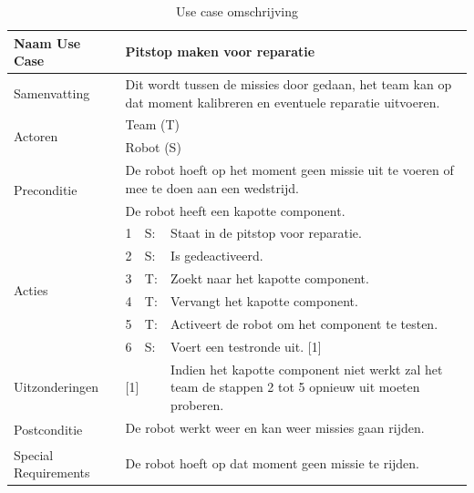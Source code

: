 \documentclass[12pt]{article} %
\begin{document}
\begin{table}[htbp]
  \centering
  \caption{Use case omschrijving}
    \begin{tabular}{llll}
    \toprule
    Naam Use Case & \multicolumn{3}{l}{\textbf{Pitstop maken voor reparatie}} \\
    \midrule
    Samenvatting & \multicolumn{3}{l}{Dit wordt tussen de missies door gedaan, het team kan op dat moment kalibreren en eventuele reparatie uitvoeren.} \\
    \multirow{2}[1]{*}{Actoren} & \multicolumn{3}{l}{Team (T)} \\
          & \multicolumn{3}{l}{Robot (S)} \\
    \multirow{2}[1]{*}{Preconditie} & \multicolumn{3}{l}{De robot hoeft op het moment geen missie uit te voeren of mee te doen aan een wedstrijd.} \\
          & \multicolumn{3}{l}{De robot heeft een kapotte component.} \\
    \multirow{6}[11]{*}{Acties} & 1     & S:    & Staat in de pitstop voor reparatie. \\
          & 2     & S:    & Is gedeactiveerd. \\
          & 3     & T:    & Zoekt naar het kapotte component. \\
          & 4     & T:    & Vervangt het kapotte component. \\
          & 5     & T:    & Activeert de robot om het component te testen. \\
          & 6     & S:    & Voert een testronde uit. [1] \\
    Uitzonderingen & \multicolumn{2}{l}{[1]} & Indien het kapotte component niet werkt zal het team de stappen 2 tot 5 opnieuw uit moeten proberen. \\
    \multirow{2}[1]{*}{Postconditie} & \multicolumn{3}{l}{De robot werkt weer en kan weer missies gaan rijden.} \\
          & \multicolumn{3}{l}{} \\
    Special Requirements  & \multicolumn{3}{l}{De robot hoeft op dat moment geen missie te rijden.} \\
    \bottomrule
    \end{tabular}%
  \label{tab:addlabel}%
\end{table}%
\clearpage




\newpage

\end{document}

